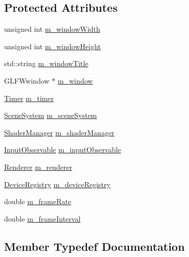 \subsection*{Protected Attributes}
\begin{DoxyCompactItemize}
\item 
unsigned int \mbox{\hyperlink{classec_1_1_window_a123952ed65bb1099068dd7ca2781bd4b}{m\+\_\+window\+Width}}
\item 
unsigned int \mbox{\hyperlink{classec_1_1_window_a1beba0a39ddf045ba3ec441b2147a874}{m\+\_\+window\+Height}}
\item 
std\+::string \mbox{\hyperlink{classec_1_1_window_a2f9c3a96c57440be25c92fc09e8913d2}{m\+\_\+window\+Title}}
\item 
G\+L\+F\+Wwindow $\ast$ \mbox{\hyperlink{classec_1_1_window_a6d40786a23714fff2de92ed74e8eb10e}{m\+\_\+window}}
\item 
\mbox{\hyperlink{classec_1_1_timer}{Timer}} \mbox{\hyperlink{classec_1_1_window_af826de73c15768bf1a4ee5dbff0e377c}{m\+\_\+timer}}
\item 
\mbox{\hyperlink{classec_1_1_scene_system}{Scene\+System}} \mbox{\hyperlink{classec_1_1_window_a5c50dfac91e6105a6862693e71976a3e}{m\+\_\+scene\+System}}
\item 
\mbox{\hyperlink{classec_1_1_shader_manager}{Shader\+Manager}} \mbox{\hyperlink{classec_1_1_window_ad4b04fabdef20b69206562d2703a7bf9}{m\+\_\+shader\+Manager}}
\item 
\mbox{\hyperlink{classec_1_1_input_observable}{Input\+Observable}} \mbox{\hyperlink{classec_1_1_window_a070efea3cadf4eaee9af066b7b21d595}{m\+\_\+input\+Observable}}
\item 
\mbox{\hyperlink{classec_1_1_renderer}{Renderer}} \mbox{\hyperlink{classec_1_1_window_a6951a4d1a08549dcc797cf12c8f46710}{m\+\_\+renderer}}
\item 
\mbox{\hyperlink{classec_1_1_device_registry}{Device\+Registry}} \mbox{\hyperlink{classec_1_1_window_a55b0d5c6b22c3540bfcb18a29a0cc181}{m\+\_\+device\+Registry}}
\item 
double \mbox{\hyperlink{classec_1_1_window_aa7245d9cfc57373c805b63ba3e8826f8}{m\+\_\+frame\+Rate}}
\item 
double \mbox{\hyperlink{classec_1_1_window_a6c56361d6931e3a5a6dcfe7a08c25e09}{m\+\_\+frame\+Interval}}
\end{DoxyCompactItemize}


\subsection{Member Typedef Documentation}
\mbox{\label{classec_1_1_window_afe0927efdedc84c345120ae15bf6994a}} 
